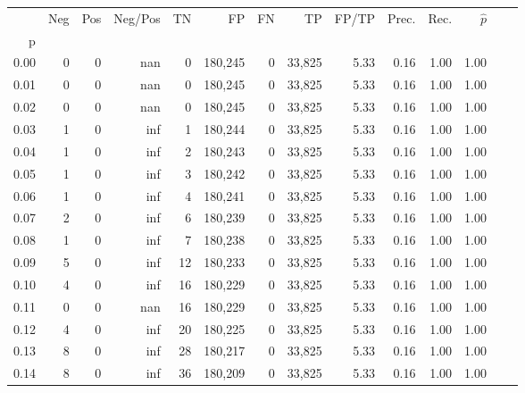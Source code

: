 \begin{tabular}{rrrrrrrrrrrrrr}
\toprule
{} &     Neg &    Pos & Neg/Pos &       TN &       FP &      FN &      TP & FP/TP & Prec. &  Rec. & $\hat{p}$ \\
p    &         &        &         &          &          &         &         &       &       &       &           \\
\midrule
0.00 &       0 &      0 &     nan &        0 &  180,245 &       0 &  33,825 &  5.33 &  0.16 &  1.00 &      1.00 \\
0.01 &       0 &      0 &     nan &        0 &  180,245 &       0 &  33,825 &  5.33 &  0.16 &  1.00 &      1.00 \\
0.02 &       0 &      0 &     nan &        0 &  180,245 &       0 &  33,825 &  5.33 &  0.16 &  1.00 &      1.00 \\
0.03 &       1 &      0 &     inf &        1 &  180,244 &       0 &  33,825 &  5.33 &  0.16 &  1.00 &      1.00 \\
0.04 &       1 &      0 &     inf &        2 &  180,243 &       0 &  33,825 &  5.33 &  0.16 &  1.00 &      1.00 \\
0.05 &       1 &      0 &     inf &        3 &  180,242 &       0 &  33,825 &  5.33 &  0.16 &  1.00 &      1.00 \\
0.06 &       1 &      0 &     inf &        4 &  180,241 &       0 &  33,825 &  5.33 &  0.16 &  1.00 &      1.00 \\
0.07 &       2 &      0 &     inf &        6 &  180,239 &       0 &  33,825 &  5.33 &  0.16 &  1.00 &      1.00 \\
0.08 &       1 &      0 &     inf &        7 &  180,238 &       0 &  33,825 &  5.33 &  0.16 &  1.00 &      1.00 \\
0.09 &       5 &      0 &     inf &       12 &  180,233 &       0 &  33,825 &  5.33 &  0.16 &  1.00 &      1.00 \\
0.10 &       4 &      0 &     inf &       16 &  180,229 &       0 &  33,825 &  5.33 &  0.16 &  1.00 &      1.00 \\
0.11 &       0 &      0 &     nan &       16 &  180,229 &       0 &  33,825 &  5.33 &  0.16 &  1.00 &      1.00 \\
0.12 &       4 &      0 &     inf &       20 &  180,225 &       0 &  33,825 &  5.33 &  0.16 &  1.00 &      1.00 \\
0.13 &       8 &      0 &     inf &       28 &  180,217 &       0 &  33,825 &  5.33 &  0.16 &  1.00 &      1.00 \\
0.14 &       8 &      0 &     inf &       36 &  180,209 &       0 &  33,825 &  5.33 &  0.16 &  1.00 &      1.00 \\

\end{tabular}
